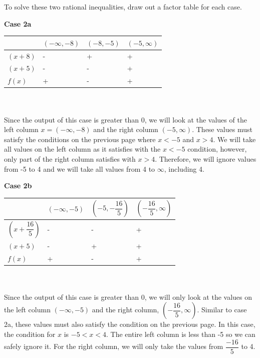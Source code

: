 \documentclass[12pt]{book}
\begin{document}
\begin{enumerate}
\begin{minipage}{.5\textwidth}
\begin{align*}
    \end{align*}
\end{minipage}
\endgroup\\
To solve these two rational inequalities, draw out a factor table for each case.
\begin{center}
    \textbf{Case 2a}
\end{center}
\begin{tabularx}{0.8\textwidth} { 
  | >{\raggedright\arraybackslash}X 
  | >{\centering\arraybackslash}X 
  | >{\centering\arraybackslash}X 
  | >{\raggedleft\arraybackslash}X | }
 \hline
  & $(-\infty, -8)$ & $(-8, -5)$ & $(-5, \infty)$ \\
 \hline
 $(x+8)$ & - & + & + \\
 \hline
 $(x+5)$ & - & - & + \\
 \hline
 $f(x)$ & + & - & + \\
 \hline
\end{tabularx}\\\\
Since the output of this case is greater than 0, we will look at the values of the left column $x = (-\infty,-8)$ and the right column $(-5, \infty)$. These values must satisfy the conditions on the previous page where $x < -5$ and $x > 4$. We will take all values on the left column as it satisfies with the $x < -5$ condition, however, only part of the right column satisfies with $x > 4$. Therefore, we will ignore values from -5 to 4 and we will take all values from 4 to $\infty$, including 4.
\begin{center}
    \textbf{Case 2b}
\end{center}
\begin{tabularx}{0.8\textwidth} { 
  | >{\raggedright\arraybackslash}X 
  | >{\centering\arraybackslash}X 
  | >{\centering\arraybackslash}X 
  | >{\raggedleft\arraybackslash}X | }
 \hline
  & $(-\infty, -5)$ & $\left(-5, -\dfrac{16}{5}\right)$ & $\left(-\dfrac{16}{5}, \infty\right)$ \\
 \hline
 $\left(x+\dfrac{16}{5}\right)$ & - &  - & +  \\
 \hline
 $(x+5)$ & -  & +  & +  \\
 \hline
 $f(x)$ &  +  & -  & +  \\
 \hline
\end{tabularx}\\\\
Since the output of this case is greater than 0, we will only look at the values on the left column $(-\infty, -5)$ and the right column, $\left(-\dfrac{16}{5}, \infty\right)$. Similar to case 2a, these values must also satisfy the condition on the previous page. In this case, the condition for $x$ is $-5 < x < 4$. The entire left column is less than -5 so we can safely ignore it. For the right column, we will only take the values from $\dfrac{-16}{5}$ to 4.


\end{enumerate}
\end{document}
